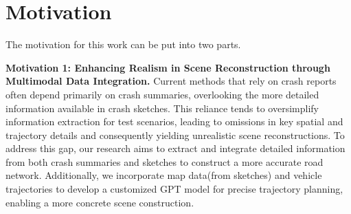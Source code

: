 \section{Motivation}
\label{sec:motivation}

The motivation for this work can be put into two parts.

\textbf{Motivation 1: Enhancing Realism in Scene Reconstruction through Multimodal Data Integration.} Current methods that rely on crash reports often depend primarily on crash summaries, overlooking the more detailed information available in crash sketches. This reliance tends to oversimplify information extraction for test scenarios, leading to omissions in key spatial and trajectory details and consequently yielding unrealistic scene reconstructions. 
To address this gap, our research aims to extract and integrate detailed information from both crash summaries and sketches to construct a more accurate road network. Additionally, we incorporate map data(from sketches) and vehicle trajectories to develop a customized GPT model for precise trajectory planning, enabling a more concrete scene construction.


